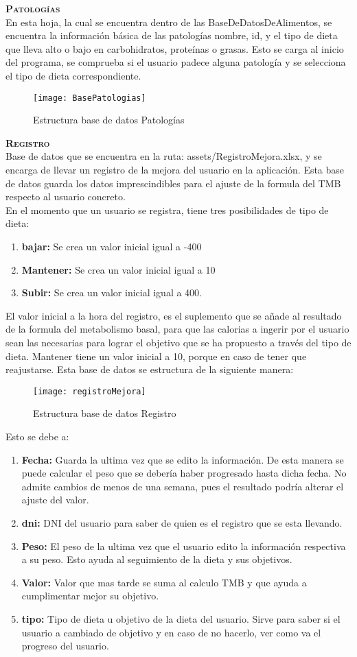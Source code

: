 \textbf{\textsc{Patologías}}\\
En esta hoja, la cual se encuentra dentro de las BaseDeDatosDeAlimentos, se encuentra la información básica de las patologías nombre, id, y el tipo de dieta que lleva alto o bajo en carbohidratos, proteínas o grasas. Esto se carga al inicio del programa, se comprueba si el usuario padece alguna patología y se selecciona el tipo de dieta correspondiente.\\
\begin{figure}[htb]
\centering
\texttt{[image: BasePatologias]} 
\caption{Estructura base de datos Patologías}
\end{figure}

\textbf{\textsc{Registro}}\\
Base de datos que se encuentra en la ruta: assets/RegistroMejora.xlsx, y se encarga de llevar un registro de la mejora del usuario en la aplicación. Esta base de datos guarda los datos imprescindibles para el ajuste de la formula del TMB respecto al usuario concreto.\\
En el momento que un usuario se registra, tiene tres posibilidades de tipo de dieta:
\begin{enumerate}
\item \textbf{bajar:} Se crea un valor inicial igual a -400
\item \textbf{Mantener:} Se crea un valor inicial igual a 10
\item \textbf{Subir:} Se crea un valor inicial igual a 400. 
\end{enumerate}
El valor inicial a la hora del registro, es el suplemento que se añade al resultado de la formula del metabolismo basal, para que las calorias a ingerir por el usuario sean las necesarias para lograr el objetivo que se ha propuesto a través del tipo de dieta. Mantener tiene un valor inicial a 10, porque en caso de tener que reajustarse.
Esta base de datos se estructura de la siguiente manera:
\begin{figure}[htb]
\centering
\texttt{[image: registroMejora]} 
\caption{Estructura base de datos Registro}
\end{figure}
Esto se debe a:
\begin{enumerate}
\item \textbf{Fecha:} Guarda la ultima vez que se edito la información. De esta manera se puede calcular el peso que se debería haber progresado hasta dicha fecha. No admite cambios de menos de una semana, pues el resultado podría alterar el ajuste del valor.
\item \textbf{dni:} DNI del usuario para saber de quien es el registro que se esta llevando.
\item \textbf{Peso:} El peso de la ultima vez que el usuario edito la información respectiva a su peso. Esto ayuda al seguimiento de la dieta y sus objetivos.
\item \textbf{Valor:} Valor que mas tarde se suma al calculo TMB y que ayuda a cumplimentar mejor su objetivo.
\item \textbf{tipo:} Tipo de dieta u objetivo de la dieta del usuario. Sirve para saber si el usuario a cambiado de objetivo y en caso de no hacerlo, ver como va el progreso del usuario.
\end{enumerate}
